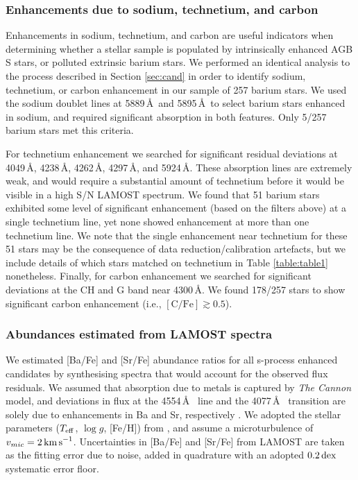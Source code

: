 \documentclass[a4paper,fleqn,usenatbib]{mnras}
\begin{document}
\subsubsection{Enhancements due to sodium, technetium, and carbon}
Enhancements in sodium, technetium, and carbon are useful indicators when determining whether a stellar sample is populated by intrinsically enhanced AGB S stars, or polluted extrinsic barium stars. We performed an identical analysis to the process described in Section \ref{sec:cand} in order to identify sodium, technetium, or carbon enhancement in our sample of 257 barium stars. We used the sodium doublet lines at 5889\,\AA\ and 5895\,\AA\ to select barium stars enhanced in sodium, and required significant absorption in both features. Only 5/257 barium stars met this criteria.

For technetium enhancement we searched for significant residual deviations at 4049\,\AA, 4238\,\AA, 4262\,\AA, 4297\,\AA, and 5924\,\AA. These absorption lines are extremely weak, and would require a substantial amount of technetium before it would be visible in a high S/N LAMOST spectrum. We found that 51 barium stars exhibited some level of significant enhancement (based on the filters above) at a single technetium line, yet none showed enhancement at more than one technetium line. We note that the single enhancement near technetium for these 51 stars may be the consequence of data reduction/calibration artefacts, but we include details of which stars matched on technetium in Table \ref{table:table1} nonetheless.
Finally, for carbon enhancement we searched for significant deviations at the CH and G band near 4300\,\AA. We found 178/257 stars to show significant carbon enhancement (i.e., $[\textrm{C/Fe}] \gtrsim 0.5$). 

\subsubsection{Abundances estimated from LAMOST spectra}
We estimated [Ba/Fe] and [Sr/Fe] abundance ratios for all s-process enhanced candidates by synthesising spectra that would account for the observed flux residuals. We assumed that absorption due to metals is captured by \emph{The Cannon} model, and deviations in flux at the 4554\,\AA\  line and the 4077\,\AA\  transition are solely due to enhancements in Ba and Sr, respectively \citep{marcs,sme,vald,ispec}. We adopted the stellar parameters ($T_{\rm eff}$, $\log{g}$, [Fe/H]) from \citet{ho2017}, and assume a microturbulence of $v_{mic} = 2\,{\rm km\,s}^{-1}$. Uncertainties in [Ba/Fe] and [Sr/Fe] from LAMOST are taken as the fitting error due to noise, added in quadrature with an adopted $0.2\,{\rm dex}$ systematic error floor.
\end{document}
